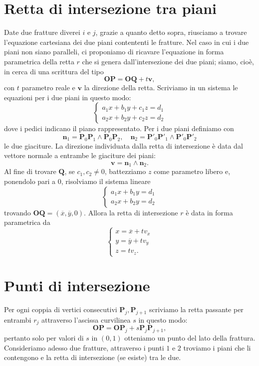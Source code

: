 \documentclass[a4paper]{article}
\newcommand{\B}{\mathbf}
\begin{document}
\section{Retta di intersezione tra piani}
Date due fratture diverei $i$ e $j$, grazie a quanto detto sopra, riusciamo a trovare l'equazione cartesiana dei due piani contententi le fratture. Nel caso in cui i due piani non siano paralleli, ci proponiamo di ricavare l'equazione in forma parametrica della retta $r$ che si genera dall'intersezione dei due piani; siamo, cioè, in cerca di una scrittura del tipo $$\B{OP}=\B{OQ}+t\B{v},$$ con $t$ parametro reale e $\B{v}$ la direzione della retta. Scriviamo in un sistema le equazioni per i due piani in questo modo: 
$$
\begin{cases}
a_1x+b_1y+c_1z=d_1\\ 
a_2x+b_2y+c_2z=d_2
\end{cases}
$$ 
dove i pedici indicano il piano rappresentato. Per i due piani definiamo con 
$$
\B{n}_1=\B{P}_0\B{P}_1\wedge \B{P}_0\B{P}_2,\quad \B{n}_2 = \B{P}'_0\B{P}'_1\wedge \B{P}'_0\B{P}'_2
$$ 
le due giaciture. La direzione individuata dalla retta di intersezione è data dal vettore normale a entrambe le giaciture dei piani: 
$$
\B{v}=\B{n}_1\wedge \B{n}_2.
$$ 
Al fine di trovare $\B{Q}$, se $c_1,c_2\neq 0$, battezziamo $z$ come parametro libero e, ponendolo pari a $0$, risolviamo il sistema lineare 
$$
\begin{cases}
a_1x+b_1y=d_1\\ 
a_2x+b_2y=d_2
\end{cases}
$$ 
trovando $\B{OQ}=(\overline{x},\overline{y},0)$. Allora la retta di intersezione $r$ è data in forma parametrica da 
$$
\begin{cases}
x=\overline{x}+tv_x \\ 
y=\overline{y}+tv_y \\ 
z=tv_z.
\end{cases}
$$

\section{Punti di intersezione}
Per ogni coppia di vertici consecutivi $\B{P}_j,\B{P}_{j+1}$ scriviamo la retta passante per entrambi $r_j$ attraverso l'ascissa curvilinea $s$ in questo modo: 
$$
\B{OP}=\B{OP}_j+s\B{P}_j\B{P}_{j+1},
$$
pertanto solo per valori di $s$ in $(0,1)$ otteniamo un punto del lato della frattura. 
Consideriamo adesso due fratture, attraverso i punti $1$ e $2$ troviamo i piani che li contengono e la retta di intersezione (se esiste) tra le due.
\end{document}
